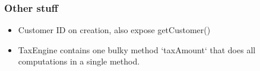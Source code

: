 \subsubsection{Other stuff}

\begin{itemize}
	 \item Customer ID on creation, also expose getCustomer() 


	 \item TaxEngine contains one bulky method `taxAmount` that does all computations in a single method. 
\end{itemize}


